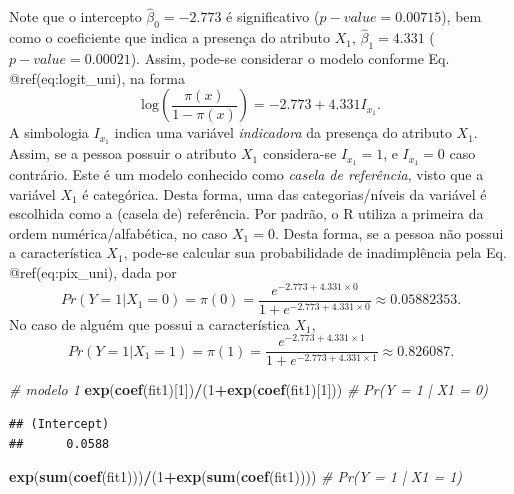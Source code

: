 \documentclass[
]{book}
\newenvironment{Shaded}{\begin{snugshade}}{\end{snugshade}}
\newcommand{\CommentTok}[1]{\textcolor[rgb]{0.56,0.35,0.01}{\textit{#1}}}
\newcommand{\DecValTok}[1]{\textcolor[rgb]{0.00,0.00,0.81}{#1}}
\newcommand{\KeywordTok}[1]{\textcolor[rgb]{0.13,0.29,0.53}{\textbf{#1}}}
\newcommand{\NormalTok}[1]{#1}
\newcommand{\OperatorTok}[1]{\textcolor[rgb]{0.81,0.36,0.00}{\textbf{#1}}}
\theoremstyle{definition}
\theoremstyle{definition}
\theoremstyle{definition}
\theoremstyle{remark}
\begin{document}
Note que o intercepto \(\hat{\beta}_0 = -2.773\) é significativo (\(p-value = 0.00715\)), bem como o coeficiente que indica a presença do atributo \(X_1\), \(\hat{\beta}_1 = 4.331\) (\(p-value = 0.00021\)). Assim, pode-se considerar o modelo conforme Eq. @ref(eq:logit\_uni), na forma \[\mathrm{log} \left( \dfrac{\pi(x)}{1-\pi(x)} \right) = -2.773 + 4.331 I_{x_1}. \] A simbologia \(I_{x_1}\) indica uma variável \emph{indicadora} da presença do atributo \(X_1\). Assim, se a pessoa possuir o atributo \(X_1\) considera-se \(I_{x_1}=1\), e \(I_{x_1}=0\) caso contrário. Este é um modelo conhecido como \emph{casela de referência}, visto que a variável \(X_1\) é categórica. Desta forma, uma das categorias/níveis da variável é escolhida como a (casela de) referência. Por padrão, o R utiliza a primeira da ordem numérica/alfabética, no caso \(X_1=0\). Desta forma, se a pessoa não possui a característica \(X_1\), pode-se calcular sua probabilidade de inadimplência pela Eq. @ref(eq:pix\_uni), dada por \[Pr(Y=1|X_1=0) = \pi(0) = \dfrac{e^{-2.773 + 4.331 \times 0}}{1+e^{-2.773 + 4.331 \times 0}} \approx 0.05882353.\] No caso de alguém que possui a característica \(X_1\), \[Pr(Y=1|X_1=1) = \pi(1) = \dfrac{e^{-2.773 + 4.331 \times 1}}{1+e^{-2.773 + 4.331 \times 1}} \approx 0.826087.\]

\begin{Shaded}
\begin{Highlighting}[]
\CommentTok{\# modelo 1}
\KeywordTok{exp}\NormalTok{(}\KeywordTok{coef}\NormalTok{(fit1)[}\DecValTok{1}\NormalTok{])}\OperatorTok{/}\NormalTok{(}\DecValTok{1}\OperatorTok{+}\KeywordTok{exp}\NormalTok{(}\KeywordTok{coef}\NormalTok{(fit1)[}\DecValTok{1}\NormalTok{])) }\CommentTok{\# Pr(Y = 1 | X1 = 0)}
\end{Highlighting}
\end{Shaded}

\begin{verbatim}
## (Intercept) 
##      0.0588
\end{verbatim}

\begin{Shaded}
\begin{Highlighting}[]
\KeywordTok{exp}\NormalTok{(}\KeywordTok{sum}\NormalTok{(}\KeywordTok{coef}\NormalTok{(fit1)))}\OperatorTok{/}\NormalTok{(}\DecValTok{1}\OperatorTok{+}\KeywordTok{exp}\NormalTok{(}\KeywordTok{sum}\NormalTok{(}\KeywordTok{coef}\NormalTok{(fit1)))) }\CommentTok{\# Pr(Y = 1 | X1 = 1)}
\end{Highlighting}
\end{Shaded}
\end{document}
